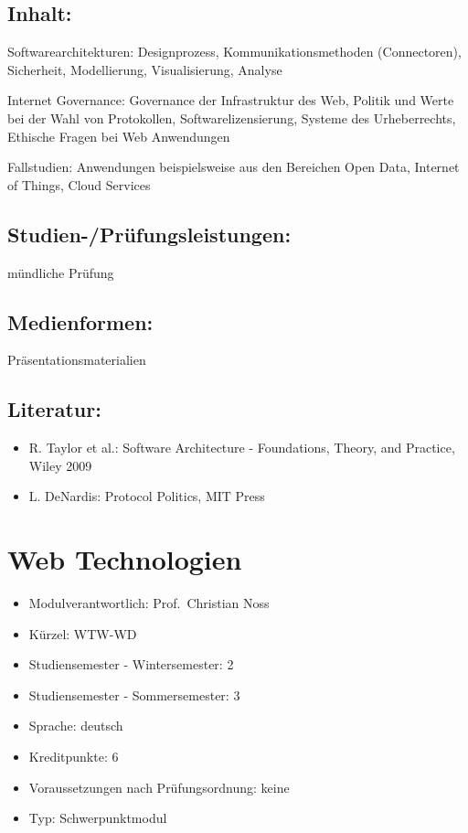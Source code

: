 \section*{Inhalt:}\label{inhalt-22}

Softwarearchitekturen: Designprozess, Kommunikationsmethoden
(Connectoren), Sicherheit, Modellierung, Visualisierung, Analyse

Internet Governance: Governance der Infrastruktur des Web, Politik und
Werte bei der Wahl von Protokollen, Softwarelizensierung, Systeme des
Urheberrechts, Ethische Fragen bei Web Anwendungen

Fallstudien: Anwendungen beispielsweise aus den Bereichen Open Data,
Internet of Things, Cloud Services

\section*{Studien-/Prüfungsleistungen:}\label{studien-pruxfcfungsleistungen-22}

mündliche Prüfung

\section*{Medienformen:}\label{medienformen-22}

Präsentationsmaterialien

\section*{Literatur:}\label{literatur-19}

\begin{itemize}
\item
  R. Taylor et al.: Software Architecture - Foundations, Theory, and
  Practice, Wiley 2009
\item
  L. DeNardis: Protocol Politics, MIT Press
\end{itemize}

\chapter{Web Technologien}\label{web-technologien}

\begin{itemize}
\tightlist
\item
  Modulverantwortlich: Prof.~Christian Noss
\item
  Kürzel: WTW-WD
\item
  Studiensemester - Wintersemester: 2
\item
  Studiensemester - Sommersemester: 3
\item
  Sprache: deutsch
\item
  Kreditpunkte: 6
\item
  Voraussetzungen nach Prüfungsordnung: keine
\item
  Typ: Schwerpunktmodul
\end{itemize}

